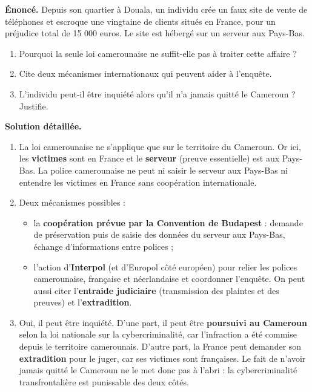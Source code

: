 \documentclass[11pt]{article}
\begin{document}
\begin{exoresolu}
\textbf{Énoncé.} Depuis son quartier à Douala, un individu crée un faux site de vente de téléphones et escroque une vingtaine de clients situés en France, pour un préjudice total de 15 000 euros. Le site est hébergé sur un serveur aux Pays-Bas.
\begin{enumerate}
\item Pourquoi la seule loi camerounaise ne suffit-elle pas à traiter cette affaire ?
\item Cite deux mécanismes internationaux qui peuvent aider à l'enquête.
\item L'individu peut-il être inquiété alors qu'il n'a jamais quitté le Cameroun ? Justifie.
\end{enumerate}
\tcblower
\textbf{Solution détaillée.}
\begin{enumerate}
\item La loi camerounaise ne s'applique que sur le territoire du Cameroun. Or ici, les \textbf{victimes} sont en France et le \textbf{serveur} (preuve essentielle) est aux Pays-Bas. La police camerounaise ne peut ni saisir le serveur aux Pays-Bas ni entendre les victimes en France sans coopération internationale.
\item Deux mécanismes possibles :
\begin{itemize}
\item la \textbf{coopération prévue par la Convention de Budapest} : demande de préservation puis de saisie des données du serveur aux Pays-Bas, échange d'informations entre polices ;
\item l'action d'\textbf{Interpol} (et d'Europol côté européen) pour relier les polices camerounaise, française et néerlandaise et coordonner l'enquête. On peut aussi citer l'\textbf{entraide judiciaire} (transmission des plaintes et des preuves) et l'\textbf{extradition}.
\end{itemize}
\item Oui, il peut être inquiété. D'une part, il peut être \textbf{poursuivi au Cameroun} selon la loi nationale sur la cybercriminalité, car l'infraction a été commise depuis le territoire camerounais. D'autre part, la France peut demander son \textbf{extradition} pour le juger, car ses victimes sont françaises. Le fait de n'avoir jamais quitté le Cameroun ne le met donc pas à l'abri : la cybercriminalité transfrontalière est punissable des deux côtés.
\end{enumerate}
\end{exoresolu}
\end{document}
